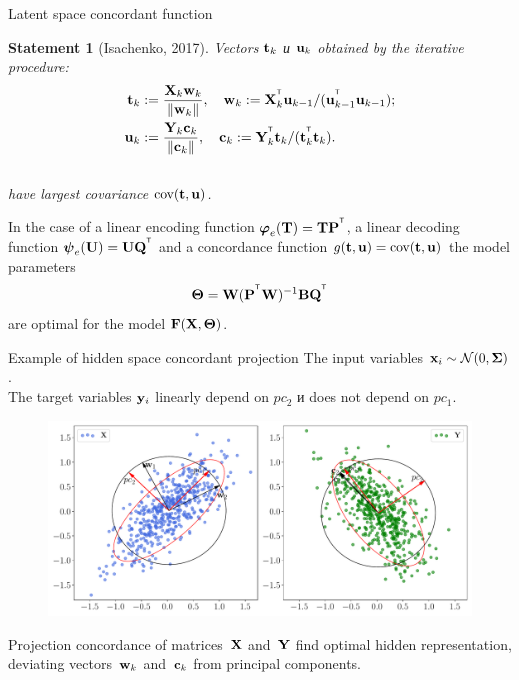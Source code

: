 \documentclass[10pt]{beamer}
\newtheorem{statement}{Statement}
\begin{document}
\begin{frame}{Latent space concordant function}
	\begin{statement}[Isachenko, 2017]
		Vectors $\mathbf{t}_k$ и $\mathbf{u}_k$ obtained by the iterative procedure:
		\vspace{-0.2cm}
		\begin{align*}
			\mathbf{t}_k &:= \frac{\mathbf{X}_k \mathbf{w}_k}{\|\mathbf{w}_k\|}, \quad  \mathbf{w}_k := \mathbf{X}_k^{^{\text{\tiny\sffamily\upshape\mdseries T}}} \mathbf{u}_{k-1} / (\mathbf{u}_{k-1}^{^{\text{\tiny\sffamily\upshape\mdseries T}}} \mathbf{u}_{k-1}); \\ 
			\mathbf{u}_k &:= \frac{\mathbf{Y}_k \mathbf{c}_k}{\| \mathbf{c}_k \|}, \quad \mathbf{c}_k := \mathbf{Y}_k^{^{\text{\tiny\sffamily\upshape\mdseries T}}} \mathbf{t}_k / (\mathbf{t}_k^{^{\text{\tiny\sffamily\upshape\mdseries T}}} \mathbf{t}_k).
		\end{align*}
		\vspace{-0.5cm} \\
		have largest covariance $\textnormal{cov}(\mathbf{t}, \mathbf{u})$.
	\end{statement}

	\begin{theorem}[Isachenko, 2017]
		In the case of a linear encoding function $\boldsymbol{\varphi}_e (\mathbf{T}) = \mathbf{T} \mathbf{P}^{^{\text{\tiny\sffamily\upshape\mdseries T}}}$, a linear decoding function $\boldsymbol{\psi}_e (\mathbf{U}) = \mathbf{U} \mathbf{Q}^{^{\text{\tiny\sffamily\upshape\mdseries T}}}$ and a concordance function $g(\mathbf{t}, \mathbf{u}) = \textnormal{cov}(\mathbf{t}, \mathbf{u})$ the model parameters
		\[
		\boldsymbol{\Theta} = \mathbf{W} (\mathbf{P}^{^{\text{\tiny\sffamily\upshape\mdseries T}}} \mathbf{W})^{-1} \mathbf{B} \mathbf{Q}^{^{\text{\tiny\sffamily\upshape\mdseries T}}}
		\]
		are optimal for the model $\mathbf{F}(\mathbf{X}, \boldsymbol{\Theta})$.
	\end{theorem}
\end{frame}
\begin{frame}{Example of hidden space concordant projection}
	The input variables $\mathbf{x}_i \sim \mathcal{N}(0, \mathbf{\Sigma})$. \\ 
	The target variables $\mathbf{y}_i$ linearly depend on $pc_2$ и does not depend on $pc_1$.
	\begin{figure}[h]
	\centering
	\includegraphics[width=\linewidth]{figs/pls_toy_example}
	\end{figure}
	Projection concordance of matrices~$\mathbf{X}$ and~$\mathbf{Y}$ find optimal hidden representation, deviating vectors~$\mathbf{w}_k$ and~$\mathbf{c}_k$ from principal components. 
\end{frame}
\end{document}
